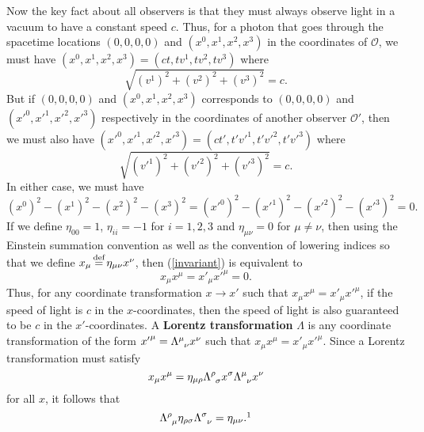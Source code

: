 Now the key fact about all observers is that they must always observe light in a vacuum to have a constant speed $c$. Thus,  for a photon that goes through the spacetime locations $(0,0,0,0)$ and $(x^0, x^1, x^2, x^3)$ in the coordinates of $\mathcal{O}$, we must have $(x^0, x^1, x^2, x^3)=(ct,tv^1,tv^2,tv^3)$ where 
$$\sqrt{(v^1)^2 +(v^2)^2+(v^3)^2}=c.$$ But if $(0,0,0,0)$ and $(x^0, x^1, x^2, x^3)$ corresponds to $(0,0,0,0)$ and $({x'}^0, {x'}^1, {x'}^2, {x'}^3)$ respectively in the coordinates of another observer $\mathcal{O}'$, then we must also have $({x'}^0, {x'}^1, {x'}^2, {x'}^3)=(ct',t'{v'}^1,t'{v'}^2,t'{v'}^3)$ where 
$$\sqrt{({v'}^1)^2 +({v'}^2)^2+({v'}^3)^2}=c.$$ 
In either case, we must have 
\begin{equation}\label{invariant}
(x^0)^2- (x^1)^2- (x^2)^2 - (x^3)^2=({x'}^0)^2- ({x'}^1)^2- ({x'}^2)^2 - ({x'}^3)^2=0.
\end{equation}
If we define $\eta_{00}=1$, $\eta_{ii}=-1$ for $i=1,2,3$ and $\eta_{\mu\nu}=0$ %
%
 for $\mu\neq\nu$, then using the Einstein summation convention as well as the convention of lowering indices so that we define $x_\mu\myeq\eta_{\mu\nu}x^\nu$, %
  then (\ref{invariant}) is equivalent to 
$$x_\mu x^\mu={x'}_\mu {x'}^\mu=0.$$ 
Thus, for any coordinate transformation $x\rightarrow x'$ such that  $x_\mu x^\mu={x'}_\mu{x'}^\mu$,  if the speed of light is $c$ in the $x$-coordinates, then the speed of light is also guaranteed to be $c$ in the $x'$-coordinates.  A \textbf{Lorentz transformation} $\Lambda$ %
%
 is any coordinate  %
 transformation of the form ${x'}^\mu=\Lambda\indices{^\mu_\nu}x^\nu$\label{coordtansformation} such that $x_\mu x^\mu={x'}_\mu{x'}^\mu$. Since a Lorentz transformation must satisfy
$$x_\mu x^\mu=\eta_{\mu\rho}\Lambda\indices{^\rho_\sigma}x^\sigma\Lambda\indices{^\mu_\nu}x^\nu$$
for all $x$, it follows that  
\begin{equation}\label{lorentztrans}
\Lambda\indices{^\rho_\mu}\eta_{\rho\sigma}\Lambda\indices{^\sigma_\nu}=\eta_{\mu\nu}.\protect\footnotemark
\end{equation}
